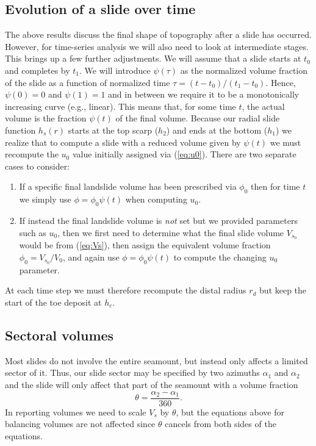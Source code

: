 \documentclass[12pt,letterpaper,margin=0.5in]{report}
\begin{document}
\subsection{Evolution of a slide over time}

The above results discuss the final shape of topography after a slide has occurred.  However, for time-series analysis
we will also need to look at intermediate stages.  This brings up a few further adjustments. We will assume that a
slide starts at $t_0$ and completes by $t_1$.  We will introduce $\psi(\tau)$ as the normalized volume fraction of the slide
as a function of normalized time $\tau = (t - t_0)/(t_1 - t_0)$.  Hence, $\psi(0) = 0$ and $\psi(1) = 1$ and
in between we require it to be a monotonically increasing curve (e.g., linear).  This means that, for some time $t$, the actual
volume is the fraction $\psi(t)$ of the final volume. Because our radial slide function $h_s(r)$ starts at the top scarp ($h_2$) and
ends at the bottom ($h_1$) we realize that to compute a slide with a reduced volume given by $\psi(t)$ we must
recompute the $u_0$ value initially assigned via (\ref{eq:u0}). There are two separate cases to consider:
\begin{enumerate}
  \item If a specific final landslide volume has been prescribed via $\phi_0$ then for time $t$ we simply use $\phi = \phi_0 \psi(t)$
  when computing $u_0$.
  \item If instead the final landslide volume is \emph{not} set but we provided parameters such as $u_0$, then we first need to determine
  what the final slide volume $V_{s_0}$ would be from (\ref{eq:Vs}), then assign the equivalent volume fraction  $\phi_0 = V_{s_0}/V_0$, and
  again use $\phi = \phi_0 \psi(t)$ to compute the changing $u_0$ parameter.
\end{enumerate}
At each time step we must therefore recompute the distal radius $r_d$ but keep the start of the toe deposit at $h_c$.
\subsection{Sectoral volumes}
Most slides do not involve the entire seamount, but instead only affects a limited sector of it.  Thus, our slide sector may be specified by two
azimuths $\alpha_1$ and $\alpha_2$ and the slide will only affect that part of the seamount with a volume fraction
\begin{equation}
\theta = \frac{\alpha_2 - \alpha_1}{360}.
\end{equation}
In reporting volumes we need to scale $V_s$ by $\theta$, but the equations above for balancing volumes are not affected since $\theta$ cancels from both sides of the equations.
\end{document}
